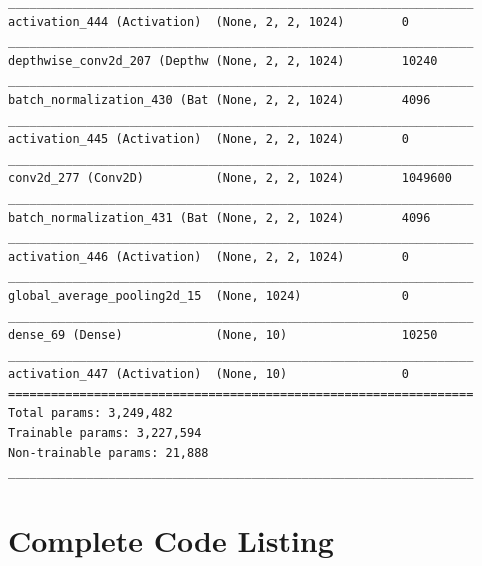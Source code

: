 \documentclass{article}
\begin{document}
\begin{appendices}
\begin{lstlisting}
_________________________________________________________________
activation_444 (Activation)  (None, 2, 2, 1024)        0         
_________________________________________________________________
depthwise_conv2d_207 (Depthw (None, 2, 2, 1024)        10240     
_________________________________________________________________
batch_normalization_430 (Bat (None, 2, 2, 1024)        4096      
_________________________________________________________________
activation_445 (Activation)  (None, 2, 2, 1024)        0         
_________________________________________________________________
conv2d_277 (Conv2D)          (None, 2, 2, 1024)        1049600   
_________________________________________________________________
batch_normalization_431 (Bat (None, 2, 2, 1024)        4096      
_________________________________________________________________
activation_446 (Activation)  (None, 2, 2, 1024)        0         
_________________________________________________________________
global_average_pooling2d_15  (None, 1024)              0         
_________________________________________________________________
dense_69 (Dense)             (None, 10)                10250     
_________________________________________________________________
activation_447 (Activation)  (None, 10)                0         
=================================================================
Total params: 3,249,482
Trainable params: 3,227,594
Non-trainable params: 21,888
_________________________________________________________________
\end{lstlisting}
\section{Complete Code Listing} \label{codelist}

\end{appendices}
\end{document}
